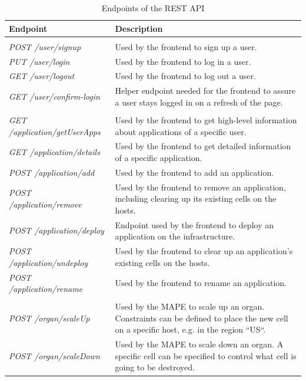 \documentclass{seal_thesis}
\begin{document}
\begin{table}
	\renewcommand{\arraystretch}{1.2}
	\caption{Endpoints of the REST API}\label{tab:endpoints}
	\begin{tabularx}{\textwidth}{|l|X|}
		\hline
		
		\textbf{Endpoint}
			& \textbf{Description}
			\\ \hline
		
		\rowcolor[gray]{0.9}
		\multicolumn{2}{|c|}{User} 
			\\ \hline
		\textit{POST /user/signup}
			& Used by the frontend to sign up a user.
			\\ \hline
		\textit{PUT /user/login}
			& Used by the frontend to log in a user.
			\\ \hline
		\textit{GET /user/logout}
			& Used by the frontend to log out a user.
			\\ \hline
		\textit{GET /user/confirm-login}
			& Helper endpoint needed for the frontend to assure a user stays logged in on a refresh of the page.
			\\ \hline

		\rowcolor[gray]{0.9}
		\multicolumn{2}{|c|}{Application} 
			\\ \hline
		\textit{GET /application/getUserApps}
			& Used by the frontend to get high-level information about applications of a specific user.
			\\ \hline
		\textit{GET /application/details}
			& Used by the frontend to get detailed information of a specific application.
			\\ \hline
		\textit{POST /application/add}
			& Used by the frontend to add an application.
			\\ \hline
		\textit{POST /application/remove}
			& Used by the frontend to remove an application, including clearing up its existing cells on the hosts.
			\\ \hline
		\textit{POST /application/deploy}
			& Endpoint used by the frontend to deploy an application on the infrastructure.
			\\ \hline
		\textit{POST /application/undeploy}
			& Used by the frontend to clear up an application's existing cells on the hosts.
			\\ \hline
		\textit{POST /application/rename}
			& Used by the frontend to rename an application.
			\\ \hline
		
		\rowcolor[gray]{0.9}
		\multicolumn{2}{|c|}{Organ} 
			\\ \hline
		\textit{POST /organ/scaleUp}
			& Used by the MAPE to scale up an organ. Constraints can be defined to place the new cell on a specific host, e.g. in the region ``US``.
			\\ \hline
		\textit{POST /organ/scaleDown}
			& Used by the MAPE to scale down an organ. A specific cell can be specified to control what cell is going to be destroyed.
			\\ \hline
			

\end{tabularx}
\end{table}
\end{document}
